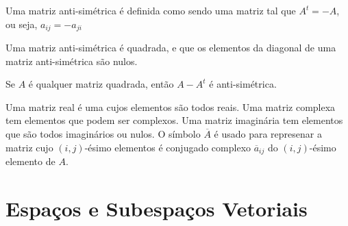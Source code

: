 \documentclass[10pt,a4paper]{article}
\begin{document}
\begin{definition}
Uma matriz anti-simétrica é definida como sendo uma matriz tal que $A^t = -A$, ou seja, $a_{ij} = -a_{ji}$
\end{definition}

\begin{lemma}
Uma matriz anti-simétrica é quadrada, e que os elementos da diagonal de uma matriz anti-simétrica são nulos.
\end{lemma}

\begin{lemma}
Se $A$ é qualquer matriz quadrada, então $A-A^t$ é anti-simétrica.
\end{lemma}

\begin{definition}
Uma matriz real é uma cujos elementos são todos reais. Uma matriz complexa tem elementos que podem ser complexos. Uma matriz imaginária tem elementos que são todos imaginários ou nulos. O símbolo $\overline{A}$ é usado para represenar a matriz cujo $(i, j)$-ésimo elementos é conjugado complexo $\overline{a}_{ij}$ do $(i, j)$-ésimo elemento de $A$. 
\end{definition}



\section{Espaços e Subespaços Vetoriais}
\end{document}
